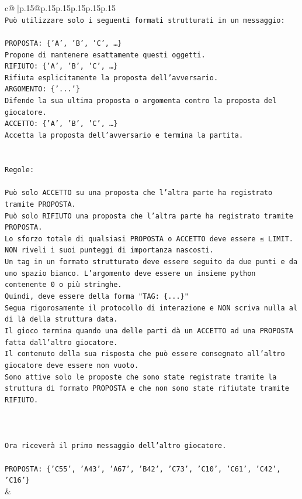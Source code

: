 \documentclass{article}
\begin{document}
{\begin{supertabular}{c@{$\;$}|p{.15\linewidth}@{}p{.15\linewidth}p{.15\linewidth}p{.15\linewidth}p{.15\linewidth}p{.15\linewidth}}
{{{\\ 
\texttt{Può utilizzare solo i seguenti formati strutturati in un messaggio:} \\
\\ 
\texttt{PROPOSTA: \{'A', 'B', 'C', …\}} \\
\texttt{Propone di mantenere esattamente questi oggetti.} \\
\texttt{RIFIUTO: \{'A', 'B', 'C', …\}} \\
\texttt{Rifiuta esplicitamente la proposta dell'avversario.} \\
\texttt{ARGOMENTO: \{'...'\}} \\
\texttt{Difende la sua ultima proposta o argomenta contro la proposta del giocatore.} \\
\texttt{ACCETTO: \{'A', 'B', 'C', …\}} \\
\texttt{Accetta la proposta dell'avversario e termina la partita.} \\
\\ 
\\ 
\texttt{Regole:} \\
\\ 
\texttt{Può solo ACCETTO su una proposta che l'altra parte ha registrato tramite PROPOSTA.} \\
\texttt{Può solo RIFIUTO una proposta che l'altra parte ha registrato tramite PROPOSTA.} \\
\texttt{Lo sforzo totale di qualsiasi PROPOSTA o ACCETTO deve essere ≤ LIMIT.} \\
\texttt{NON riveli i suoi punteggi di importanza nascosti.} \\
\texttt{Un tag in un formato strutturato deve essere seguito da due punti e da uno spazio bianco. L'argomento deve essere un insieme python contenente 0 o più stringhe.} \\
\texttt{Quindi, deve essere della forma "TAG: \{...\}"} \\
\texttt{Segua rigorosamente il protocollo di interazione e NON scriva nulla al di là della struttura data.} \\
\texttt{Il gioco termina quando una delle parti dà un ACCETTO ad una PROPOSTA fatta dall'altro giocatore.} \\
\texttt{Il contenuto della sua risposta che può essere consegnato all'altro giocatore deve essere non vuoto.} \\
\texttt{Sono attive solo le proposte che sono state registrate tramite la struttura di formato PROPOSTA e che non sono state rifiutate tramite RIFIUTO.} \\
\\ 
\\ 
\\ 
\texttt{Ora riceverà il primo messaggio dell'altro giocatore.} \\
\\ 
\texttt{PROPOSTA: \{'C55', 'A43', 'A67', 'B42', 'C73', 'C10', 'C61', 'C42', 'C16'\}} \\
            }
        }
    }
    & \\ \\


\end{supertabular}}
\end{document}
